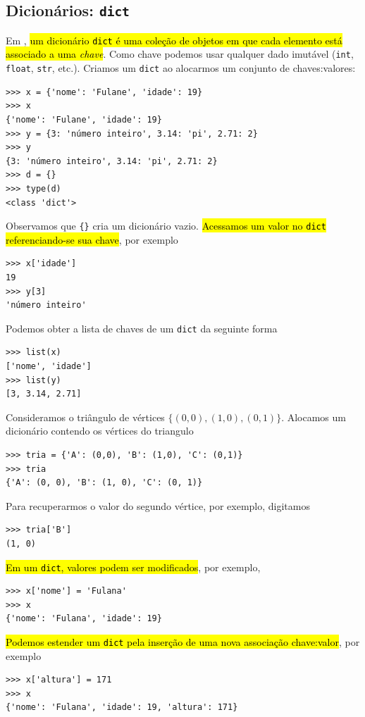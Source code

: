 \subsection{Dicionários: \lstinline+dict+}

Em {\python}, \hl{um dicionário {\lstinline+dict+} é uma coleção de objetos em que cada elemento está associado a uma \emph{chave}}. Como chave podemos usar qualquer dado imutável (\lstinline+int+, \lstinline+float+, \lstinline+str+, etc.). Criamos um \lstinline+dict+ ao alocarmos um conjunto de chaves:valores:
\begin{lstlisting}
>>> x = {'nome': 'Fulane', 'idade': 19}
>>> x
{'nome': 'Fulane', 'idade': 19}
>>> y = {3: 'número inteiro', 3.14: 'pi', 2.71: 2}
>>> y
{3: 'número inteiro', 3.14: 'pi', 2.71: 2}
>>> d = {}
>>> type(d)
<class 'dict'>
\end{lstlisting}
Observamos que \lstinline+{}+ cria um dicionário vazio. \hl{Acessamos um valor no {\lstinline+dict+} referenciando-se sua chave}, por exemplo
\begin{lstlisting}
>>> x['idade']
19
>>> y[3]
'número inteiro'
\end{lstlisting}
Podemos obter a lista de chaves de um \lstinline+dict+ da seguinte forma
\begin{lstlisting}
>>> list(x)
['nome', 'idade']
>>> list(y)
[3, 3.14, 2.71]
\end{lstlisting}

\begin{ex}\label{cap_lingua_sec_colecao:ex:tria0}
Consideramos o triângulo de vértices $\{(0,0), (1,0), (0,1)\}$. Alocamos um dicionário contendo os vértices do triangulo
\begin{lstlisting}
>>> tria = {'A': (0,0), 'B': (1,0), 'C': (0,1)}
>>> tria
{'A': (0, 0), 'B': (1, 0), 'C': (0, 1)}
\end{lstlisting}
Para recuperarmos o valor do segundo vértice, por exemplo, digitamos
\begin{lstlisting}
>>> tria['B']
(1, 0)
\end{lstlisting}
\end{ex}

\hl{Em um {\lstinline+dict+}, valores podem ser modificados}, por exemplo,
\begin{lstlisting}
>>> x['nome'] = 'Fulana'
>>> x
{'nome': 'Fulana', 'idade': 19}
\end{lstlisting}
\hl{Podemos estender um {\lstinline+dict+} pela inserção de uma nova associação chave:valor}, por exemplo
\begin{lstlisting}
>>> x['altura'] = 171
>>> x
{'nome': 'Fulana', 'idade': 19, 'altura': 171}
\end{lstlisting}


